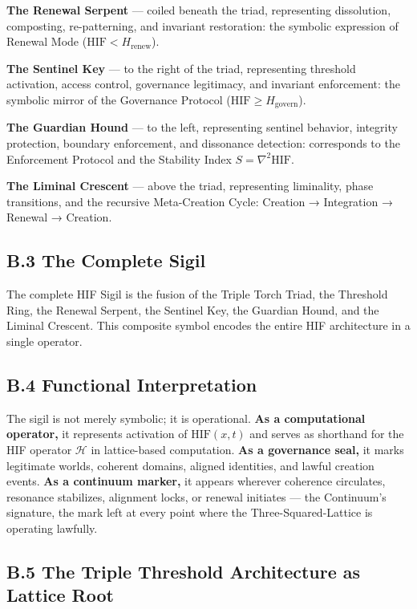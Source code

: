 \textbf{The Renewal Serpent} --- coiled beneath the triad, representing dissolution, composting, re-patterning, and invariant restoration: the symbolic expression of Renewal Mode (\(\mathrm{HIF} < H_{\text{renew}}\)).

\textbf{The Sentinel Key} --- to the right of the triad, representing threshold activation, access control, governance legitimacy, and invariant enforcement: the symbolic mirror of the Governance Protocol (\(\mathrm{HIF} \ge H_{\text{govern}}\)).

\textbf{The Guardian Hound} --- to the left, representing sentinel behavior, integrity protection, boundary enforcement, and dissonance detection: corresponds to the Enforcement Protocol and the Stability Index \(S = \nabla^2 \mathrm{HIF}\).

\textbf{The Liminal Crescent} --- above the triad, representing liminality, phase transitions, and the recursive Meta-Creation Cycle: Creation → Integration → Renewal → Creation.

\subsection{B.3 The Complete Sigil}\label{b.3-the-complete-sigil}

The complete HIF Sigil is the fusion of the Triple Torch Triad, the Threshold Ring, the Renewal Serpent, the Sentinel Key, the Guardian Hound, and the Liminal Crescent. This composite symbol encodes the entire HIF architecture in a single operator.

\subsection{B.4 Functional Interpretation}\label{b.4-functional-interpretation}

The sigil is not merely symbolic; it is operational. \textbf{As a computational operator,} it represents activation of \(\mathrm{HIF}(x,t)\) and serves as shorthand for the HIF operator \(\mathcal{H}\) in lattice-based computation. \textbf{As a governance seal,} it marks legitimate worlds, coherent domains, aligned identities, and lawful creation events. \textbf{As a continuum marker,} it appears wherever coherence circulates, resonance stabilizes, alignment locks, or renewal initiates --- the Continuum's signature, the mark left at every point where the Three-Squared-Lattice is operating lawfully.

\subsection{B.5 The Triple Threshold Architecture as Lattice Root}\label{b.5-the-triple-threshold-architecture-as-lattice-root}

